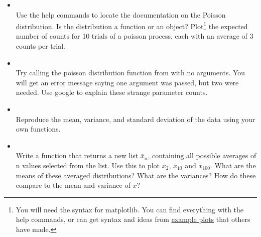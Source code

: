 \documentclass[justified, nobib]{tufte-handout}
\newcommand{\matplotlibGalleryLink}{http://matplotlib.org/gallery.html}
\newcommand{\matplotlibGalleryNote}{\footnote{You will need the syntax for
      matplotlib. You can find everything with the help commands, or can get
      syntax and ideas from \href{\matplotlibGalleryLink}{example plots} that
      others have made.}}
\begin{document}
\begin{itemize}
\item[]  \\
  Use the help commands to locate the  documentation
  on the Poisson distribution.
  Is the distribution a function or an object?
  Plot\matplotlibGalleryNote{} the expected number of counts for 10 trials of
  a poisson process, each with an average of 3 counts per trial.

\item[]  \\
  Try calling the poisson distribution function from
   with no arguments.
  You will get an error message saying one argument was passed, but two were
  needed.
  Use google to explain these strange parameter counts.

\item[]  \\
  Reproduce the mean, variance, and standard deviation of the data using your
  own functions.




\item[]
 \\
  Write a function  that returns a new list
  $\bar{x}_n$, containing all possible averages of n values selected from the
  list.
  Use this to plot $\bar{x}_2$, $\bar{x}_{10}$ and $\bar{x}_{100}$.
  What are the means of these averaged distributions?
  What are the variances?
  How do these compare to the mean and variance of $x$?
\end{itemize}
\end{document}

